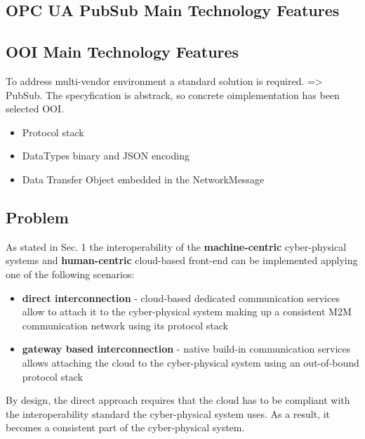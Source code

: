 \documentclass[
]{article}
\providecommand{\tightlist}{%
  \setlength{\itemsep}{0pt}\setlength{\parskip}{0pt}}
\begin{document}
\hypertarget{opc-ua-pubsub-main-technology-features}{%
\subsection{OPC UA PubSub Main Technology
Features}\label{opc-ua-pubsub-main-technology-features}}

\hypertarget{ooi-main-technology-features}{%
\subsection{OOI Main Technology
Features}\label{ooi-main-technology-features}}

To address multi-vendor environment a standard solution is required.
=\textgreater{} PubSub. The specyfication is abstrack, so concrete
oimplementation has been selected OOI.

\begin{itemize}
\tightlist
\item
  Protocol stack
\item
  DataTypes binary and JSON encoding
\item
  Data Transfer Object embedded in the NetworkMessage
\end{itemize}

\hypertarget{problem}{%
\subsection{Problem}\label{problem}}

As stated in Sec. 1 the interoperability of the \textbf{machine-centric}
cyber-physical systems and \textbf{human-centric} cloud-based front-end
can be implemented applying one of the following scenarios:

\begin{itemize}
\tightlist
\item
  \textbf{direct interconnection} - cloud-based dedicated communication
  services allow to attach it to the cyber-physical system making up a
  consistent M2M communication network using its protocol stack
\item
  \textbf{gateway based interconnection} - native build-in communication
  services allows attaching the cloud to the cyber-physical system using
  an out-of-bound protocol stack
\end{itemize}

By design, the direct approach requires that the cloud has to be
compliant with the interoperability standard the cyber-physical system
uses. As a result, it becomes a consistent part of the cyber-physical
system.
\end{document}
